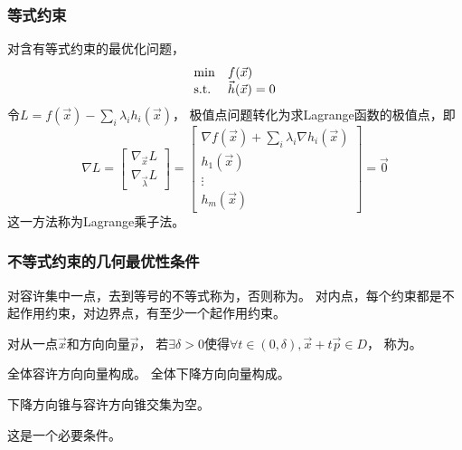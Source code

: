 \subsubsection{等式约束}
对含有等式约束的最优化问题，
\[
    \begin{array}{ll}
        \min & f(\vec{x})\\
        \mathrm{s.t.} & \vec{h}(\vec{x})=0 \\
    \end{array}
\]
令$L=f(\vec{x}) - \sum_i \lambda_i h_i(\vec{x})$，
极值点问题转化为求Lagrange函数的极值点，即
\[
    \nabla L =
    \begin{bmatrix}
        \nabla_{\vec{x}} L \\ \nabla_{\vec{\lambda}} L
    \end{bmatrix} =
    \begin{bmatrix}
        \nabla f(\vec{x}) + \sum\limits_i \lambda_i \nabla h_i(\vec{x}) \\
        h_1(\vec{x}) \\
        \vdots \\
        h_m(\vec{x})
    \end{bmatrix} = \vec{0}
\]
这一方法称为Lagrange乘子法。

\subsubsection{不等式约束的几何最优性条件}
\begin{definition}
    对容许集中一点，去到等号的不等式称为，否则称为。
    对内点，每个约束都是不起作用约束，对边界点，有至少一个起作用约束。
\end{definition}

\begin{definition}
    对从一点$\vec{x}$和方向向量$\vec{p}$，
    若$\exists \delta>0$使得$\forall t\in (0,\delta),\vec{x}+t\vec{p}\in D$，
    称为。
\end{definition}

\begin{definition}[锥。凸锥。]
\end{definition}

\begin{definition}
    全体容许方向向量构成。
    全体下降方向向量构成。
\end{definition}

\begin{theorem}[几何最优性条件]
    下降方向锥与容许方向锥交集为空。
\end{theorem}
这是一个必要条件。

